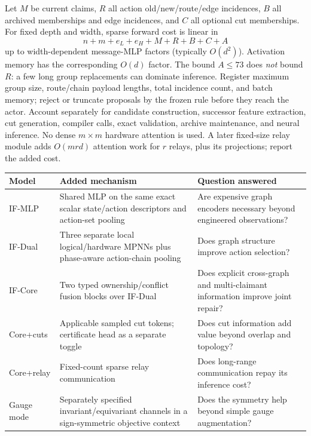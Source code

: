 Let \(M\) be current claims, \(R\) all action old/new/route/edge incidences, \(B\) all archived memberships and edge incidences, and \(C\) all optional cut memberships. For fixed depth and width, sparse forward cost is linear in
\[
 n+m+e_L+e_H+M+R+B+C+A
\]
up to width-dependent message-MLP factors (typically \(O(d^2)\)). Activation memory has the corresponding \(O(d)\) factor. The bound \(A\le73\) does \emph{not} bound \(R\): a few long group replacements can dominate inference. Register maximum group size, route/chain payload lengths, total incidence count, and batch memory; reject or truncate proposals by the frozen rule before they reach the actor. Account separately for candidate construction, successor feature extraction, cut generation, compiler calls, exact validation, archive maintenance, and neural inference. No dense \(m\times m\) hardware attention is used. A later fixed-size relay module adds \(O(mrd)\) attention work for \(r\) relays, plus its projections; report the added cost.

\begin{center}
\small
\begin{tabularx}{\textwidth}{@{}p{}XX@{}}
\toprule
Model & Added mechanism & Question answered \\
\midrule
IF-MLP & Shared MLP on the same exact scalar state/action descriptors and action-set pooling & Are expensive graph encoders necessary beyond engineered observations? \\
IF-Dual & Three separate local logical/hardware MPNNs plus phase-aware action-chain pooling & Does graph structure improve action selection? \\
IF-Core & Two typed ownership/conflict fusion blocks over IF-Dual & Does explicit cross-graph and multi-claimant information improve joint repair? \\
Core+cuts & Applicable sampled cut tokens; certificate head as a separate toggle & Does cut information add value beyond overlap and topology? \\
Core+relay & Fixed-count sparse relay communication & Does long-range communication repay its inference cost? \\
Gauge mode & Separately specified invariant/equivariant channels in a sign-symmetric objective context & Does the symmetry help beyond simple gauge augmentation? \\
\bottomrule
\end{tabularx}
\end{center}

